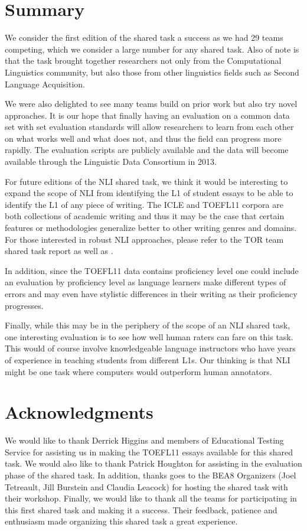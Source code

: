 \documentclass[11pt,letterpaper]{article}
\begin{document}
\section{Summary}
\label{sec-summary}
We consider the first edition of the shared task a success as we had
29 teams competing, which we consider a large number for any
shared task.  Also of note is that the task brought together
researchers not only from the Computational Linguistics community,
but also those from other linguistics fields such as Second
Language Acquisition.

We were also delighted to see many teams build on
prior work but also try novel approaches.  It is our hope that
finally having an evaluation on a common data set with set
evaluation standards will allow researchers to learn from each
other on what works well and what does not, and thus the
field can progress more rapidly.  The evaluation scripts are
publicly available and the data will become
available through the Linguistic Data Consortium in 2013.

For future editions of the NLI shared task, we think it would be
interesting to expand the scope of NLI from identifying the L1
of student essays to be able to identify the L1 of any piece of
writing.  The ICLE and \textsc{TOEFL11} corpora are both
collections of academic writing and thus it may be the case that
certain features or methodologies generalize better to other
writing genres and domains.  For those interested in robust
NLI approaches, please refer to the TOR team shared task report
as well as \cite{brooke-hirst:2012:PAPERS}.

In addition, since the \textsc{TOEFL11} data contains proficiency level
one could include an evaluation by
proficiency level
as language learners make different types of errors
and may even have stylistic differences in their writing as their
proficiency progresses.

Finally, while this may be in the periphery of the scope of an
NLI shared task, one interesting evaluation is to see how well
human raters can fare on this task.  This would of course involve
knowledgeable language instructors who have years of experience
in teaching students from different L1s.  Our thinking is that NLI
might be one task where computers would outperform human annotators.

\section*{Acknowledgments}
We would like to thank Derrick Higgins and members of Educational
Testing Service for assisting us in making the \textsc{TOEFL11} essays
available for this shared task.  We would also like to thank
Patrick Houghton for assisting in the evaluation phase of the shared task.
In addition, thanks goes to the BEA8 Organizers (Joel Tetreault,
Jill Burstein and Claudia Leacock) for hosting the shared
task with their workshop.  Finally, we would like to thank all the teams for
participating in this first shared task and making it a success.
Their feedback, patience and enthusiasm made organizing this
shared task a great experience.
\end{document}
